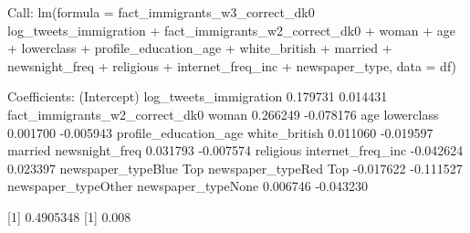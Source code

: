 
Call:
lm(formula = fact_immigrants_w3_correct_dk0 ~ log_tweets_immigration + 
    fact_immigrants_w2_correct_dk0 + woman + age + lowerclass + 
    profile_education_age + white_british + married + newsnight_freq + 
    religious + internet_freq_inc + newspaper_type, data = df)

Coefficients:
                   (Intercept)          log_tweets_immigration  
                      0.179731                        0.014431  
fact_immigrants_w2_correct_dk0                           woman  
                      0.266249                       -0.078176  
                           age                      lowerclass  
                      0.001700                       -0.005943  
         profile_education_age                   white_british  
                      0.011060                       -0.019597  
                       married                  newsnight_freq  
                      0.031793                       -0.007574  
                     religious               internet_freq_inc  
                     -0.042624                        0.023397  
        newspaper_typeBlue Top           newspaper_typeRed Top  
                     -0.017622                       -0.111527  
           newspaper_typeOther              newspaper_typeNone  
                      0.006746                       -0.043230  

[1] 0.4905348
[1] 0.008
